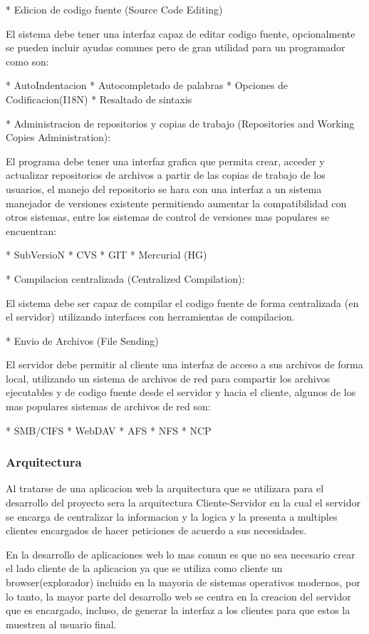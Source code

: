 * Edicion de codigo fuente (Source Code Editing)

El sistema debe tener una interfaz capaz de editar codigo fuente, opcionalmente se pueden incluir ayudas comunes pero de gran utilidad para un programador como son:

* AutoIndentacion
* Autocompletado de palabras
* Opciones de Codificacion(I18N)
* Resaltado de sintaxis


* Administracion de repositorios y copias de trabajo (Repositories and Working Copies Administration):

El programa debe tener una interfaz grafica que permita crear, acceder y actualizar repositorios de archivos a partir de las copias de trabajo de los usuarios, el manejo del repositorio se hara con una interfaz a un sistema manejador de versiones existente permitiendo aumentar la compatibilidad con otros sistemas, entre los sistemas de control de versiones mas populares se encuentran:

* SubVersioN
* CVS
* GIT
* Mercurial (HG)


* Compilacion centralizada (Centralized Compilation):

El sistema debe ser capaz de compilar el codigo fuente de forma centralizada (en el servidor) utilizando interfaces con herramientas de compilacion.

* Envio de Archivos (File Sending)

El servidor debe permitir al cliente una interfaz de acceso a sus archivos de forma local, utilizando un sistema de archivos de red para compartir los archivos ejecutables y de codigo fuente desde el servidor y hacia el cliente, algunos de los mas populares sistemas de archivos de red son:

* SMB/CIFS
* WebDAV
* AFS
* NFS
* NCP



\subsubsection{Arquitectura}

Al tratarse de una aplicacion web la arquitectura que se utilizara para el desarrollo del proyecto sera la arquitectura Cliente-Servidor en la cual el servidor se encarga de centralizar la informacion y la logica y la presenta a multiples clientes encargados de hacer peticiones de acuerdo a sus necesidades.

En la desarrollo de aplicaciones web lo mas comun es que no sea necesario crear el lado cliente de la aplicacion ya que se utiliza como cliente un browser(explorador) incluido en la mayoria de sistemas operativos modernos, por lo tanto, la mayor parte del desarrollo web se centra en la creacion del servidor que es encargado, incluso, de generar la interfaz a los clientes para que estos la muestren al usuario final.

